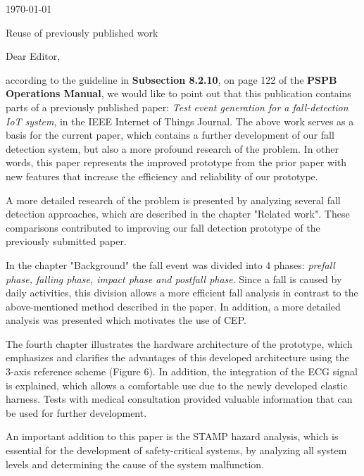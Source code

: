 \documentclass[parskip]{scrartcl}
\begin{document}
 
\pagestyle{empty}

\begin{flushright}
    \Large
    \today
\end{flushright}

\begin{center}
    \huge
    Reuse of previously published work \\
    \vspace{0.4cm}

\end{center}
 
    \vspace{0.8cm}

    \normalsize

Dear Editor,

according to the guideline in \textbf{Subsection 8.2.10}, on page 122 of the \textbf{PSPB Operations Manual}, we would like to point out that this publication contains parts of a previously published paper: \textit{Test event generation for a fall-detection IoT system}, in the IEEE Internet of Things Journal. The above work serves as a basis for the current paper, which contains a further development of our fall detection system, but also a more profound research of the problem. In other words, this paper represents the improved prototype from the prior paper with new features that increase the efficiency and reliability of our prototype.

A more detailed research of the problem is presented by analyzing several fall detection approaches, which are described in the chapter "Related work". These comparisons contributed to improving our fall detection prototype of the previously submitted paper. 

In the chapter "Background" the fall event was divided into 4 phases: \textit{prefall phase, falling phase, impact phase and postfall phase}. Since a fall is caused by daily activities, this division allows a more efficient fall analysis in contrast to the above-mentioned method described in the paper.
In addition, a more detailed analysis was presented which motivates the use of CEP. 

The fourth chapter illustrates the hardware architecture of the prototype, which emphasizes and clarifies the advantages of this developed architecture using the 3-axis reference scheme (Figure 6). In addition, the integration of the ECG signal is explained, which allows a comfortable use due to the newly developed elastic harness. Tests with medical consultation provided valuable information that can be used for further development. 

An important addition to this paper is the STAMP hazard analysis, which is essential for the development of safety-critical systems, by analyzing all system levels and determining the cause of the system malfunction. \cite{FallRepo}



\end{document}
